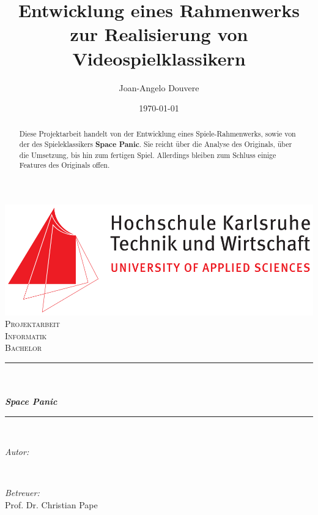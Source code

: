 \documentclass[12pt]{article}
\title{Entwicklung eines Rahmenwerks zur Realisierung von Videospielklassikern} %
\author{Joan-Angelo Douvere} %
\date{\today} %
\makeatletter
\let\thetitle\@title
\let\theauthor\@author
\let\thedate\@date
\makeatother
\begin{document}

\begin{titlepage}
	\centering
    \vspace*{0.5 cm}
    \includegraphics[scale = 0.25]{images/Hska_logo}\\[1.0 cm]
    \textsc{\LARGE Projektarbeit}\\[2.0 cm]
	\textsc{\Large Informatik}\\[0.5 cm]
	\textsc{\large Bachelor}\\[0.5 cm]
	\rule{\linewidth}{0.2 mm} \\[0.4 cm]
	{ \huge \bfseries \thetitle}\\ [0.3 cm]
    { \LARGE \bfseries \textit{Space Panic}}\\
	\rule{\linewidth}{0.2 mm} \\[1.5 cm]
    
	
	\begin{minipage}{0.4\textwidth}
		\begin{flushleft} \large
			\emph{Autor:}\\
			\theauthor
			\end{flushleft}
			\end{minipage}~
			\begin{minipage}{0.4\textwidth}
			\begin{flushright} \large
			\emph{Betreuer:} \\
			Prof. Dr. Christian Pape
		\end{flushright}
	\end{minipage}\\[2 cm]
	
	{\large \thedate}\\[2 cm]
 
	\vfill
	
\end{titlepage}

\begin{abstract}
        \noindent Diese Projektarbeit handelt von der Entwicklung eines Spiele-Rahmenwerks, sowie von der des Spieleklassikers \textbf{Space Panic}. Sie reicht über die Analyse des Originals, über die Umsetzung, bis hin zum fertigen Spiel. Allerdings bleiben zum Schluss einige Features des Originals offen.
\end{abstract}
    
\end{document}
